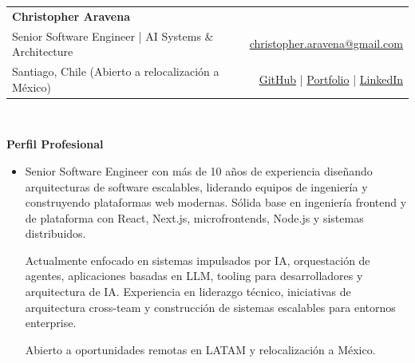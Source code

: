 \documentclass[letterpaper,11pt]{article}
\newcommand{\resheading}[1]{{\large \colorbox{mygrey}{\begin{minipage}{\textwidth}{\textbf{#1 \vphantom{p\^{E}}}}\end{minipage}}}}
\begin{document}
    
    \newcommand{\mywebheader}{
    \begin{tabular*}{7in}{l@{\extracolsep{\fill}}r}
        \textbf{{\LARGE Christopher Aravena}}\\
        {\footnotesize Senior Software Engineer | AI Systems \& Architecture} & \href{mailto:christopher.aravena@gmail.com}{christopher.aravena@gmail.com}\\
        {\footnotesize Santiago, Chile (Abierto a relocalización a México)} & \href{https://github.com/caravenas}{GitHub} \hspace{0.5em}|\hspace{0.5em} \href{https://chrisaravena.dev/}{Portfolio} \hspace{0.5em}|\hspace{0.5em} \href{https://www.linkedin.com/in/christopher-aravena-a0763135/}{LinkedIn}\\
        \end{tabular*}
    \\
    \vspace{0.1in}}
    
    \mywebheader
    
    \resheading{Perfil Profesional}
        \begin{itemize}
            \item[]
                { \footnotesize
                Senior Software Engineer con más de 10 años de experiencia diseñando arquitecturas de software escalables, liderando equipos de ingeniería y construyendo plataformas web modernas.
                Sólida base en ingeniería frontend y de plataforma con React, Next.js, microfrontends, Node.js y sistemas distribuidos.

                Actualmente enfocado en sistemas impulsados por IA, orquestación de agentes, aplicaciones basadas en LLM, tooling para desarrolladores y arquitectura de IA.
                Experiencia en liderazgo técnico, iniciativas de arquitectura cross-team y construcción de sistemas escalables para entornos enterprise.

                Abierto a oportunidades remotas en LATAM y relocalización a México.
                }
        \end{itemize}
\end{document}
